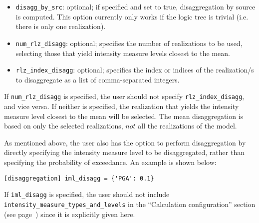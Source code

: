 \begin{itemize}
    \item \Verb+disagg_by_src+: optional; if specified and set to true,
	    disaggregation by source is computed. This option currently only
		works if the logic tree is trivial (i.e. there is only one
		realization).

    \item \Verb+num_rlz_disagg+: optional; specifies the number of realizations
	    to be used, selecting those that yield intensity measure levels
		closest to the mean.  

    \item \Verb+rlz_index_disagg+: optional; specifies the index or indices of
	    the realization/s to disaggregate as a list of comma-separated
		integers.

\end{itemize}

If \texttt{num\_rlz\_disagg} is specified, the user should not specify
\texttt{rlz\_index\_disagg}, and vice versa. If neither is specified, the
realization that yields the intensity measure level closest to the mean will be
selected. The mean disaggregation is based on only the selected realizations,
$not$ all the realizations of the model.  

As mentioned above, the user also has the option to perform disaggregation by
directly specifying the intensity measure level to be disaggregated, rather than
specifying the probability of exceedance. An example is shown below:

\begin{verbatim}
[disaggregation] iml_disagg = {'PGA': 0.1} \end{verbatim}

If \texttt{iml\_disagg} is specified, the user should not include
\texttt{intensity\_measure\_types\_and\_levels} in the ``Calculation
configuration'' section (see page~\pageref{sec:calculation_configuration}) since
it is explicitly given here.

